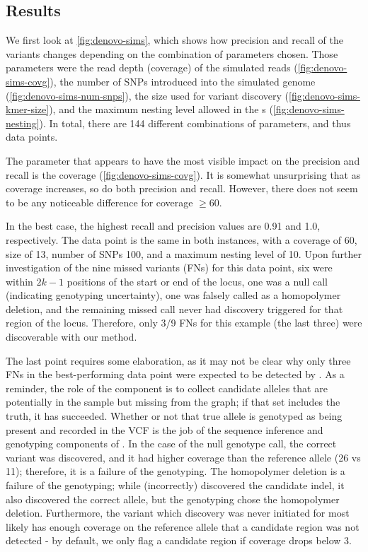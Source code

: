 \subsection{Results}
\label{sec:denovo-sims-results}

We first look at \autoref{fig:denovo-sims}, which shows how precision and recall of the \pandora{} \denovo{} variants changes depending on the combination of parameters chosen. Those parameters were the read depth (coverage) of the simulated reads (\autoref{fig:denovo-sims-covg}), the number of SNPs introduced into the simulated genome (\autoref{fig:denovo-sims-num-snps}), the \kmer{} size used for variant discovery (\autoref{fig:denovo-sims-kmer-size}), and the maximum nesting level allowed in the \prg{}s (\autoref{fig:denovo-sims-nesting}). In total, there are 144 different combinations of parameters, and thus data points.

The parameter that appears to have the most visible impact on the precision and recall is the coverage (\autoref{fig:denovo-sims-covg}). It is somewhat unsurprising that as coverage increases, so do both precision and recall. However, there does not seem to be any noticeable difference for coverage $\ge 60$.

In the best case, the highest recall and precision values are 0.91 and 1.0, respectively. The data point is the same in both instances, with a coverage of 60, \kmer{} size of 13, number of SNPs 100, and a maximum nesting level of 10. Upon further investigation of the nine missed variants (FNs) for this data point, six were within $2k-1$ positions of the start or end of the locus, one was a null call (indicating genotyping uncertainty), one was falsely called as a homopolymer deletion, and the remaining missed call never had \denovo{} discovery triggered for that region of the locus. Therefore, only 3/9 FNs for this example (the last three) were discoverable with our \denovo{} method.

The last point requires some elaboration, as it may not be clear why only three FNs in the best-performing data point were expected to be detected by \denovo{}. As a reminder, the role of the \denovo{} component is to collect candidate alleles that are potentially in the sample but missing from the graph; if that set includes the truth, it has succeeded. Whether or not that true allele is genotyped as being present and recorded in the VCF is the job of the sequence inference and genotyping components of \pandora{}. In the case of the null genotype call, the correct variant was discovered, and it had higher coverage than the reference allele (26 vs 11); therefore, it is a failure of the genotyping. The homopolymer deletion is a failure of the genotyping; while \denovo{} (incorrectly) discovered the candidate indel, it also discovered the correct allele, but the genotyping chose the homopolymer deletion. Furthermore, the variant which \denovo{} discovery was never initiated for most likely has enough coverage on the reference allele that a candidate region was not detected - by default, we only flag a candidate region if coverage drops below 3.

